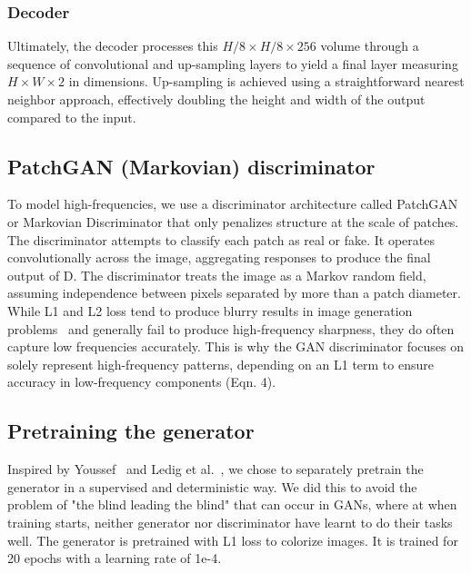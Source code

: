 \documentclass[10pt,twocolumn,letterpaper]{article}
\begin{document}
\subsubsection{Decoder} 
Ultimately, the decoder processes this \(H/8\times H/8\times 256\) volume through a sequence of convolutional and up-sampling layers to yield a final layer measuring \(H\times W\times 2\) in dimensions. Up-sampling is achieved using a straightforward nearest neighbor approach, effectively doubling the height and width of the output compared to the input.

 
\subsection{PatchGAN (Markovian) discriminator}
To model high-frequencies, we use a discriminator architecture called PatchGAN or Markovian Discriminator that only penalizes structure at the scale of patches. The discriminator attempts to classify each patch as real or fake. It operates convolutionally across the image, aggregating responses to produce the final output of D. The discriminator treats the image as a Markov random field, assuming independence between pixels separated by more than a patch diameter. While L1 and L2 loss tend to produce blurry results in image generation problems~\cite{Larsen} and generally fail to produce high-frequency sharpness, they do often capture low frequencies accurately. This is why the GAN discriminator focuses on solely represent high-frequency patterns, depending on an L1 term to ensure accuracy in low-frequency components (Eqn. 4). 

\subsection{Pretraining the generator}
Inspired by Youssef~\cite{Youssef} and Ledig et al.~\cite{Ledig}, we chose to separately pretrain the generator in a supervised and deterministic way. We did this to avoid the problem of "the blind leading the blind" that can occur in GANs, where at when training starts, neither generator nor discriminator have learnt to do their tasks well. The generator is pretrained with L1 loss to colorize images. It is trained for 20 epochs with a learning rate of 1e-4.
\end{document}
